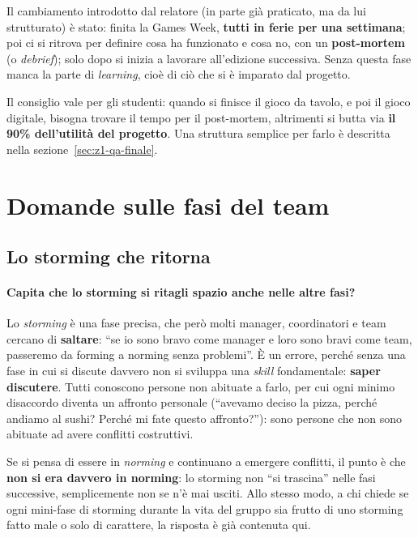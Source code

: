 Il cambiamento introdotto dal relatore (in parte già praticato, ma da lui
strutturato) è stato: finita la Games Week, \textbf{tutti in ferie per una
settimana}; poi ci si ritrova per definire cosa ha funzionato e cosa no, con
un \textbf{post-mortem} (o \emph{debrief}); solo dopo si inizia a lavorare
all'edizione successiva. Senza questa fase manca la parte di
\emph{learning}, cioè di ciò che si è imparato dal progetto.

Il consiglio vale per gli studenti: quando si finisce il gioco da tavolo, e
poi il gioco digitale, bisogna trovare il tempo per il post-mortem,
altrimenti si butta via \textbf{il 90\% dell'utilità del progetto}. Una
struttura semplice per farlo è descritta nella sezione~\ref{sec:z1-qa-finale}.

\section{Domande sulle fasi del team}
\label{sec:z1-qa-fasi}

\subsection{Lo storming che ritorna}

\paragraph{Capita che lo storming si ritagli spazio anche nelle altre fasi?}
Lo \emph{storming} è una fase precisa, che però molti manager, coordinatori e
team cercano di \textbf{saltare}: ``se io sono bravo come manager e loro sono
bravi come team, passeremo da forming a norming senza problemi''. È un errore,
perché senza una fase in cui si discute davvero non si sviluppa una
\emph{skill} fondamentale: \textbf{saper discutere}. Tutti conoscono persone
non abituate a farlo, per cui ogni minimo disaccordo diventa un affronto
personale (``avevamo deciso la pizza, perché andiamo al sushi? Perché mi fate
questo affronto?''): sono persone che non sono abituate ad avere conflitti
costruttivi.

Se si pensa di essere in \emph{norming} e continuano a emergere conflitti, il
punto è che \textbf{non si era davvero in norming}: lo storming non ``si
trascina'' nelle fasi successive, semplicemente non se n'è mai usciti.
Allo stesso modo, a chi chiede se ogni mini-fase di storming durante la vita
del gruppo sia frutto di uno storming fatto male o solo di carattere, la
risposta è già contenuta qui.

